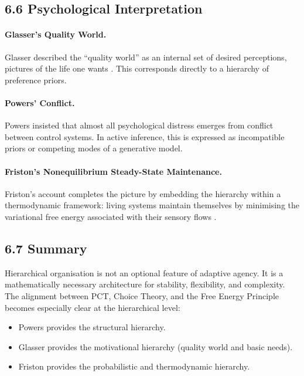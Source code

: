 \documentclass[11pt,a4paper,twoside]{article}
\begin{document}
\subsection*{6.6 Psychological Interpretation}

\paragraph{Glasser’s Quality World.}
Glasser described the “quality world” as an internal set of desired perceptions,
pictures of the life one wants
\cite{glasser1981stations,glasser1998choice}.
This corresponds directly to a hierarchy of preference priors.

\paragraph{Powers’ Conflict.}
Powers insisted that almost all psychological distress emerges from conflict between control systems.
In active inference, this is expressed as incompatible priors or competing modes of a generative model.

\paragraph{Friston’s Nonequilibrium Steady-State Maintenance.}
Friston’s account completes the picture by embedding the hierarchy within a thermodynamic framework:
living systems maintain themselves by minimising the variational free energy associated with their sensory flows
\cite{friston2009free,friston2010free,friston2013life}.

\subsection*{6.7 Summary}

Hierarchical organisation is not an optional feature of adaptive agency.
It is a mathematically necessary architecture for stability, flexibility, and complexity.
The alignment between PCT, Choice Theory, and the Free Energy Principle becomes especially clear at the hierarchical level:

\begin{itemize}
    \item Powers provides the structural hierarchy.
    \item Glasser provides the motivational hierarchy (quality world and basic needs).
    \item Friston provides the probabilistic and thermodynamic hierarchy.
\end{itemize}
\end{document}
